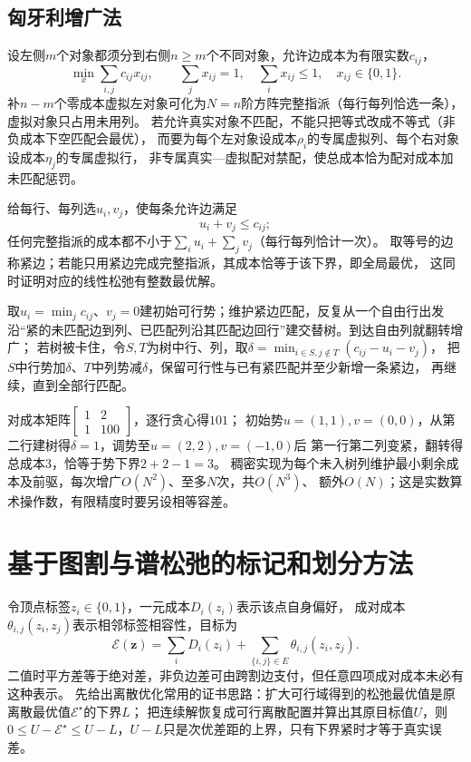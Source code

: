 \subsection{匈牙利增广法}
\label{sec:graph-weighted-assignment}
设左侧$m$个对象都须分到右侧$n\geq m$个不同对象，允许边成本为有限实数$c_{ij}$，
\begin{equation}
  \min_x\sum_{i,j}c_{ij}x_{ij},\qquad
  \sum_jx_{ij}=1,\quad \sum_ix_{ij}\leq1,\quad x_{ij}\in\{0,1\}.
  \label{eq:graph-rectangular-assignment}
\end{equation}
补$n-m$个零成本虚拟左对象可化为$N=n$阶方阵完整指派（每行每列恰选一条），虚拟对象只占用未用列。
若允许真实对象不匹配，不能只把等式改成不等式（非负成本下空匹配会最优），
而要为每个左对象设成本$\rho_i$的专属虚拟列、每个右对象设成本$\eta_j$的专属虚拟行，
非专属真实—虚拟配对禁配，使总成本恰为配对成本加未匹配惩罚。

给每行、每列选$u_i,v_j$，使每条允许边满足
\begin{equation}
  u_i+v_j\leq c_{ij};
  \label{eq:graph-assignment-potentials}
\end{equation}
任何完整指派的成本都不小于$\sum_i u_i+\sum_j v_j$（每行每列恰计一次）。
取等号的边称紧边；若能只用紧边完成完整指派，其成本恰等于该下界，即全局最优，
这同时证明对应的线性松弛有整数最优解。
\begin{algorithm}[匈牙利紧边增广]
  取$u_i=\min_j c_{ij}$、$v_j=0$建初始可行势；维护紧边匹配，反复从一个自由行出发
  沿“紧的未匹配边到列、已匹配列沿其匹配边回行”建交替树。到达自由列就翻转增广；
  若树被卡住，令$S,T$为树中行、列，取$\delta=\min_{i\in S,j\notin T}(c_{ij}-u_i-v_j)$，
  把$S$中行势加$\delta$、$T$中列势减$\delta$，保留可行性与已有紧匹配并至少新增一条紧边，
  再继续，直到全部行匹配。
\end{algorithm}
对成本矩阵$\begin{bmatrix}1&2\\1&100\end{bmatrix}$，逐行贪心得$101$；
初始势$u=(1,1),v=(0,0)$，从第二行建树得$\delta=1$，调势至$u=(2,2),v=(-1,0)$后
第一行第二列变紧，翻转得总成本$3$，恰等于势下界$2+2-1=3$。
稠密实现为每个未入树列维护最小剩余成本及前驱，每次增广$O(N^2)$、至多$N$次，共$O(N^3)$、
额外$O(N)$；这是实数算术操作数，有限精度时要另设相等容差。

\section{基于图割与谱松弛的标记和划分方法}

令顶点标签$z_i\in\{0,1\}$，一元成本$D_i(z_i)$表示该点自身偏好，
成对成本$\theta_{i,j}(z_i,z_j)$表示相邻标签相容性，目标为
\begin{equation}
  \mathcal E(\bm z)=\sum_iD_i(z_i)+\sum_{\{i,j\}\in E}\theta_{i,j}(z_i,z_j).
  \label{eq:graph-theory-binary-pairwise-energy}
\end{equation}
二值时平方差等于绝对差，非负边差可由跨割边支付，但任意四项成对成本未必有这种表示。
先给出离散优化常用的证书思路：扩大可行域得到的松弛最优值是原离散最优值$\mathcal E^\star$的下界$L$；
把连续解恢复成可行离散配置并算出其原目标值$U$，则
$0\leq U-\mathcal E^\star\leq U-L$，$U-L$只是次优差距的上界，只有下界紧时才等于真实误差。

